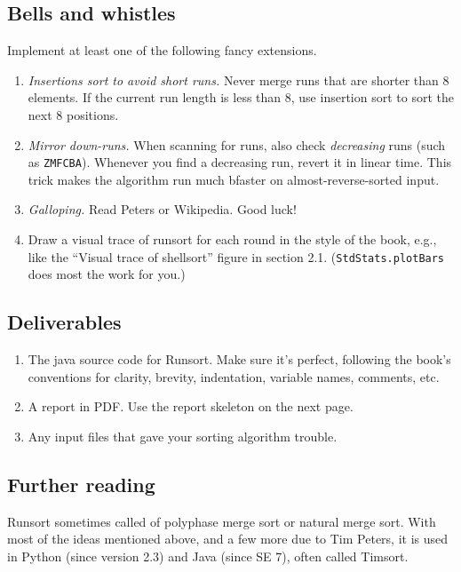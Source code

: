 \documentclass{tufte-handout}
\begin{document}
\subsection{Bells and whistles}
Implement at least one of the following fancy extensions.
\begin{enumerate}
\item \emph{Insertions sort to avoid short runs.}
  Never merge runs that are shorter than 8 elements.
  If the current run length is less than 8,
  use insertion sort to sort the next 8 positions.
\item \emph{Mirror down-runs.}
  When scanning for runs, also check \emph{decreasing} runs (such as \texttt{ZMFCBA}).
  Whenever you find a decreasing run, revert it in linear time.
  This trick makes the algorithm run much bfaster on almost-reverse-sorted input.
\item \emph{Galloping.} Read Peters or Wikipedia. Good luck!
\item Draw a visual trace of runsort for each round in the style of the book, e.g., like the ``Visual trace of shellsort'' figure in section 2.1.
  (\texttt{StdStats.plotBars} does most the work for you.)
\end{enumerate}

\subsection{Deliverables}

\begin{enumerate}
  \item The java source code for Runsort.
      Make sure it's perfect, following the book's conventions for clarity, brevity, indentation, variable names, comments, etc.
  \item A report in PDF.
  Use the report skeleton on the next page.
  \item Any input files that gave your sorting algorithm trouble.
\end{enumerate}

\subsection{Further reading}
Runsort sometimes called of polyphase merge sort or natural merge sort.
With most of the ideas mentioned above, and a few more due to Tim Peters, it is used in Python (since version 2.3) and Java (since SE 7), often called Timsort.
\end{document}

